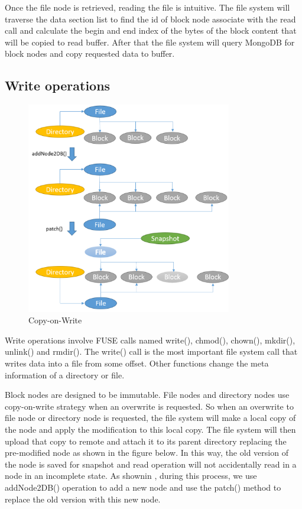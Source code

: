     Once the file node is retrieved, reading the file is intuitive. The file system will traverse the data section list to find the id of block node associate with the read call and calculate the begin and end index of the bytes of the block content that will be copied to read buffer. After that the file system will query MongoDB for block nodes and copy requested data to buffer.

\subsection{Write operations}

\begin{figure}[hbtp]
\centering
\includegraphics[width=0.8\textwidth]{Chapter-3/figs/fig10.png}
\caption{Copy-on-Write}
\label{fig:cow}
\end{figure}

    Write operations involve FUSE calls named write(), chmod(), chown(), mkdir(), unlink() and rmdir(). The write() call is the most important file system call that writes data into a file from some offset. Other functions change the meta information of a directory or file.

    Block nodes are designed to be immutable. File nodes and directory nodes use copy-on-write strategy when an overwrite is requested. So when an overwrite to file node or directory node is requested, the file system will make a local copy of the node and apply the modification to this local copy. The file system will then upload that copy to remote and attach it to its parent directory replacing the pre-modified node as shown in the figure below. In this way, the old version of the node is saved for snapshot and read operation will not accidentally read in a node in an incomplete state. As shownin , during this process, we use addNode2DB() operation to add a new node and use the patch() method to replace the old version with this new node.

